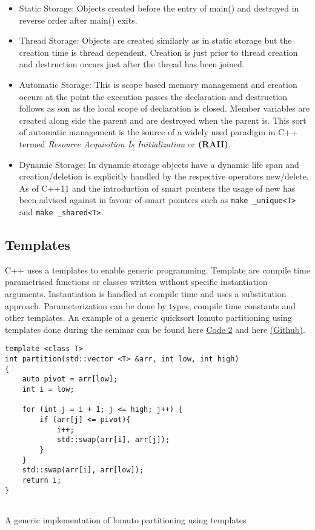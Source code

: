 \documentclass[conference, a4paper]{IEEEtran}
\begin{document}
\begin{itemize}
    \item Static Storage: Objects created before the entry of main() and destroyed in reverse order after main() exits.
    \item Thread Storage:  Objects are created similarly as in static storage but the creation time is thread dependent. Creation is just prior to thread creation and destruction occurs just after the thread has been joined. 
    \item Automatic Storage: This is scope based memory management and creation occurs at the point the execution passes the declaration and destruction follows as son as the local scope of declaration is closed. Member variables are created along side the parent and are destroyed when the parent is. This sort of automatic management is the source of a widely used paradigm in C++ termed \textit{Resource Acquisition Is Initialization} or \textbf{(RAII)}.
    \item Dynamic Storage: In dynamic storage objects have a dynamic life span and creation/deletion is explicitly handled by the respective operators new/delete. As of C++11 and the introduction of smart pointers the usage of new has been advised against in favour of smart pointers such as \texttt{make _unique<T>} and \texttt{make _shared<T>}.

\end{itemize}

\subsection{Templates}

C++ uses a templates to enable generic programming. Template are compile time parametrised functions or classes written without specific instantiation arguments. Instantiation is handled at compile time and uses a substitution approach. Parameterization can be done by types, compile time constants and other templates. An example of a generic quicksort lomuto partitioning using templates done during the seminar can be found here \hyperref[listing:2]{Code 2} and here \href{https://github.com/qasimwarraich/PLP/blob/master/A2/Task1/quicksort/quicksort.cpp}{(Github)}.


\begin{listing}[htb]
\begin{verbatim}
template <class T>
int partition(std::vector <T> &arr, int low, int high)
{
    auto pivot = arr[low];
    int i = low;

    for (int j = i + 1; j <= high; j++) {
        if (arr[j] <= pivot){
            i++;
            std::swap(arr[i], arr[j]);
        }
    }
    std::swap(arr[i], arr[low]);
    return i; 
}
        
    \end{verbatim}
    
    \caption{A generic implementation of lomuto partitioning using templates}
\label{listing:2}
\end{listing}
\end{document}

